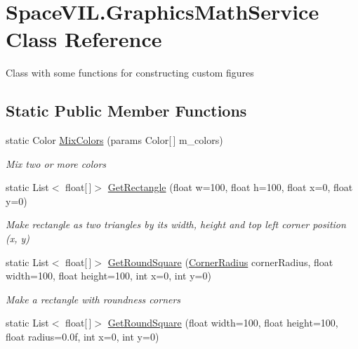 \hypertarget{class_space_v_i_l_1_1_graphics_math_service}{}\section{Space\+V\+I\+L.\+Graphics\+Math\+Service Class Reference}
\label{class_space_v_i_l_1_1_graphics_math_service}


Class with some functions for constructing custom figures  


\subsection*{Static Public Member Functions}
\begin{DoxyCompactItemize}
\item 
static Color \mbox{\hyperlink{class_space_v_i_l_1_1_graphics_math_service_a8ab75011a7323b3766254c4b47bdd9b8}{Mix\+Colors}} (params Color\mbox{[}$\,$\mbox{]} m\+\_\+colors)
\begin{DoxyCompactList}\small\item\em Mix two or more colors \end{DoxyCompactList}\item 
static List$<$ float\mbox{[}$\,$\mbox{]}$>$ \mbox{\hyperlink{class_space_v_i_l_1_1_graphics_math_service_aa65cde8859be0b310d39c25e739521b0}{Get\+Rectangle}} (float w=100, float h=100, float x=0, float y=0)
\begin{DoxyCompactList}\small\item\em Make rectangle as two triangles by its width, height and top left corner position (x, y) \end{DoxyCompactList}\item 
static List$<$ float\mbox{[}$\,$\mbox{]}$>$ \mbox{\hyperlink{class_space_v_i_l_1_1_graphics_math_service_a5338875ad53badd15319b2af0a2996f6}{Get\+Round\+Square}} (\mbox{\hyperlink{class_space_v_i_l_1_1_decorations_1_1_corner_radius}{Corner\+Radius}} corner\+Radius, float width=100, float height=100, int x=0, int y=0)
\begin{DoxyCompactList}\small\item\em Make a rectangle with roundness corners \end{DoxyCompactList}\item 
static List$<$ float\mbox{[}$\,$\mbox{]}$>$ \mbox{\hyperlink{class_space_v_i_l_1_1_graphics_math_service_ae15153ace846e904562a42540d655007}{Get\+Round\+Square}} (float width=100, float height=100, float radius=0.\+0f, int x=0, int y=0)

\end{DoxyCompactItemize}
